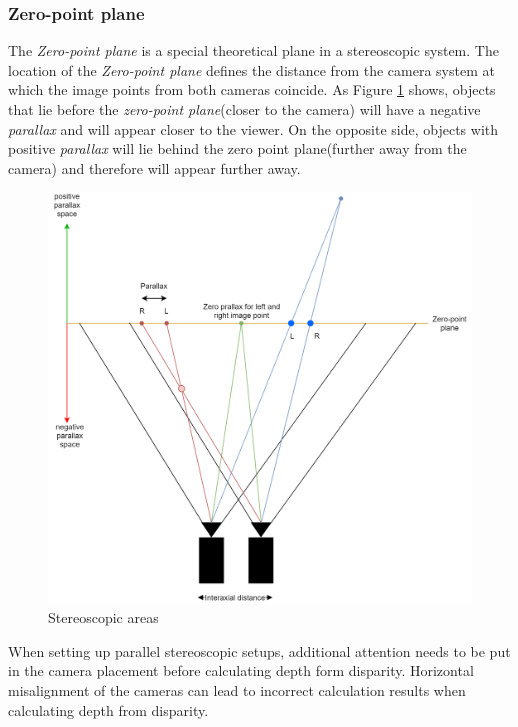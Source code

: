 \subsubsection{Zero-point plane}
The\textit{ Zero-point plane} is a special theoretical plane in a stereoscopic system. The location of the  \textit{Zero-point plane} defines the distance from the camera system at which the image points from both cameras coincide. As Figure \ref{img:stereo_diagram} shows, objects that lie before the \textit{zero-point plane}(closer to the camera) will have a negative \textit{parallax} and will appear closer to the viewer. On the opposite side, objects with positive \textit{parallax} will lie behind the zero point plane(further away from the camera) and therefore will appear further away.
\begin{figure}[H]
\includegraphics[width=\textwidth]{images/Stereo_diagram.png}
\caption{Stereoscopic areas}
\label{img:stereo_diagram} 
\end{figure}
When setting up parallel stereoscopic setups, additional attention needs to be put in the camera placement before calculating depth form disparity. Horizontal misalignment of the cameras can lead to incorrect calculation results when calculating depth from disparity.
